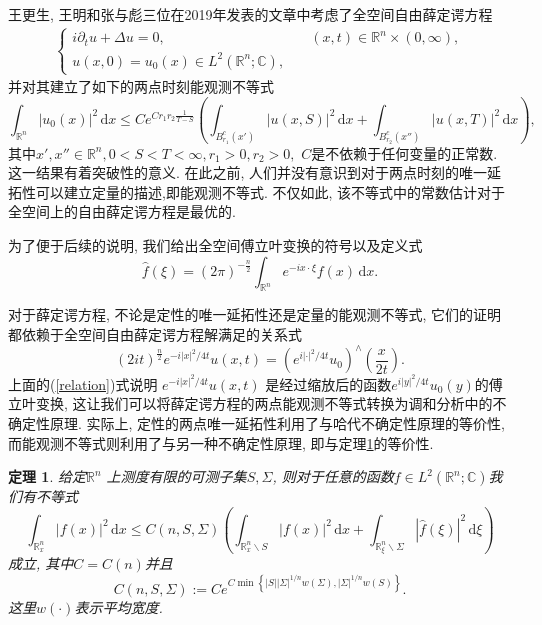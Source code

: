 \documentclass[master]{cugthesis}
\newcommand\R{\ensuremath{\mathbb{R}}}
\renewcommand\d{\ensuremath{\,\mathrm{d}}}
\renewcommand\C{\ensuremath{\mathbb{C}}}
\newtheorem{theorem}{定理}[section]
\begin{document}
    王更生, 王明和张与彪三位在2019年发表的文章中\cite{Geng2019}考虑了全空间自由薛定谔方程
\begin{align}
  \left\{\begin{array}{lc} i\partial_t u + \Delta u=0, &\quad (x,t)\in \R^{n}\times (0,\infty),\\
    u(x,0)=u_0(x) \in L^2\left( \R^{n};\C \right), & 
  \end{array}
\right.\label{sch-f}
\end{align}
并对其建立了如下的两点时刻能观测不等式
    \begin{equation}
      \int_{\R^{n}}|u_0(x)|^2\d x\le Ce^{Cr_1r_2 \frac{1}{T-S}}\left( \int_{B^{c}_{r_1}(x')}|u(x,S)|^2 \d x+\int_{B^{c}_{r_2}(x'')}|u(x,T)|^2\d x \right), 
    \end{equation}
    其中$x',x'' \in \R^{n},0<S<T<\infty,r_1>0,r_2>0,$ $C$是不依赖于任何变量的正常数. 这一结果有着突破性的意义. 在此之前, 人们并没有意识到对于两点时刻的唯一延拓性可以建立定量的描述,即能观测不等式. 不仅如此, 该不等式中的常数估计对于全空间上的自由薛定谔方程是最优的. 
 
    为了便于后续的说明, 我们给出全空间傅立叶变换的符号以及定义式
    \[
      \widehat{f}(\xi)=(2\pi)^{- \frac{n}{2}}\int_{\R^{n}}e^{-ix\cdot \xi}f(x)\d x.
    \] 

    对于薛定谔方程, 不论是定性的唯一延拓性还是定量的能观测不等式, 它们的证明都依赖于全空间自由薛定谔方程解满足的关系式\cite{Esca2008convexity}
    \begin{equation}
      \left( 2it \right) ^{\frac{n}{2}}e^{-i|x|^2 /4t} u(x,t)= \left( e^{i|\cdot |^2 /4t} u_0 \right) ^{\wedge}\left(\frac{x}{2t}\right).\label{relation}
    \end{equation}
    上面的(\ref{relation})式说明 $e^{-i |x|^2 / 4t} u(x,t)$ 是经过缩放后的函数$e^{i|y|^2 /4t}u_0(y)$的傅立叶变换, 这让我们可以将薛定谔方程的两点能观测不等式转换为调和分析中的不确定性原理. 实际上, 定性的两点唯一延拓性利用了与哈代不确定性原理的等价性, 而能观测不等式则利用了与另一种不确定性原理, 即与定理\ref{thm-uncertainty}的等价性\cite{JAMING200730}.
    \begin{theorem}\label{thm-uncertainty}
      给定$\R^{n}$ 上测度有限的可测子集$S,\Sigma$, 则对于任意的函数$f\in L^2\left( \R^{n};\C \right) $我们有不等式
      \[
	\int_{\R^{n}_x}|f(x)|^2\d x\le C\left( n,S,\Sigma \right) \left( \int_{\R^{n}_x\backslash  S}|f(x)|^2\d x+\int_{\R^{n}_{\xi} \backslash  \Sigma}|\widehat{f}(\xi)|^2\d \xi \right) 
      \] 
      成立, 其中$C=C(n)$并且
       \begin{equation}
	 C(n,S,\Sigma):= Ce^{C\min \left\{|S| |\Sigma|^{1 /n} w(\Sigma),|\Sigma|^{1 /n}w(S)\right\} }. 
       \end{equation}这里$w(\cdot )$表示平均宽度.
    \end{theorem}
\end{document}
